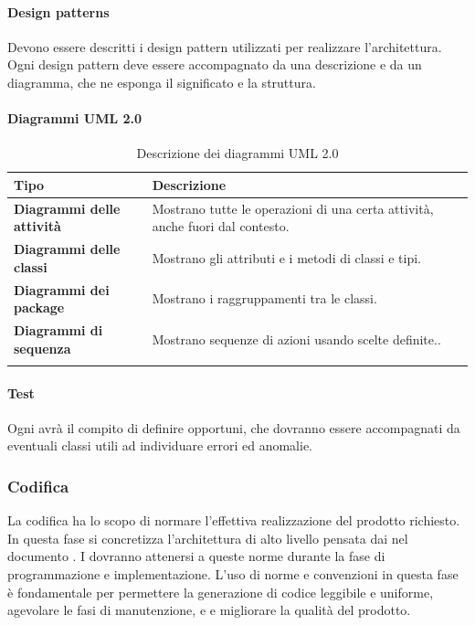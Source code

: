 \paragraph*{Design patterns}
Devono essere descritti i design pattern utilizzati per realizzare l'architettura. Ogni design pattern deve essere accompagnato da una descrizione e da un diagramma, che ne esponga il significato e la struttura.
\newpage
\paragraph*{Diagrammi UML 2.0}

{
\setlength{\freewidth}{\dimexpr\textwidth-0\tabcolsep}
	\renewcommand{\arraystretch}{1.5}
	\setlength{\aboverulesep}{0pt}
	\setlength{\belowrulesep}{0pt}
	\begin{longtable}{L{.210\freewidth} L{.6\freewidth} L{.080\freewidth}}
		\textbf{Tipo} & \textbf{Descrizione} \\
		\toprule
		\endhead		
		\textbf{Diagrammi delle attività} & Mostrano tutte le operazioni di una certa attività, anche fuori dal contesto. \\
		\textbf{Diagrammi delle classi} & Mostrano gli attributi e i metodi di classi e tipi.\\
		\textbf{Diagrammi dei package} & Mostrano i raggruppamenti tra le classi. \\
		\textbf{Diagrammi di sequenza} & Mostrano sequenze di azioni usando scelte definite.. \\
		\bottomrule
		\hiderowcolors
		\caption{Descrizione dei diagrammi UML 2.0}
	\end{longtable}
}
\paragraph*{Test}
Ogni \prog{} avrà il compito di definire  opportuni, che dovranno essere accompagnati da eventuali classi utili ad individuare errori ed anomalie.
\subsubsection{Codifica}
La codifica ha lo scopo di normare l'effettiva realizzazione del prodotto  richiesto. In questa fase si concretizza l'architettura di alto livello pensata dai \progs{} nel documento \PdQ{}. I \progrs{} dovranno attenersi a queste norme durante la fase di programmazione e implementazione. L'uso di norme e convenzioni in questa fase è fondamentale per permettere la generazione di codice leggibile e uniforme, agevolare le fasi di manutenzione,  e  e migliorare la qualità del prodotto.
